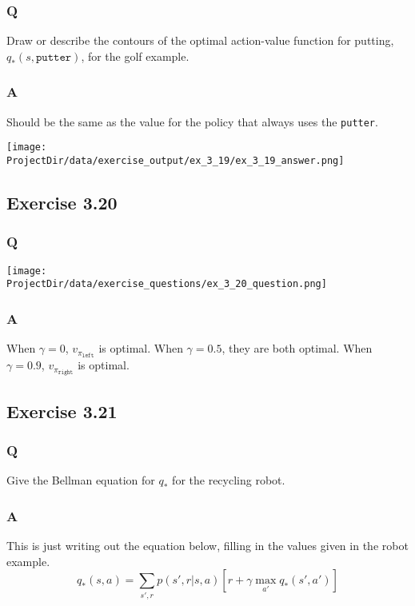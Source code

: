 \subsubsection*{Q}
 Draw or describe the contours of the optimal action-value function for putting, $q_*(s, \mathtt{putter})$, for the golf example.

\subsubsection*{A}
Should be the same as the value for the policy that always uses the \texttt{putter}.

\texttt{[image: \\ProjectDir/data/exercise\_output/ex\_3\_19/ex\_3\_19\_answer.png]}


\subsection{Exercise 3.20}
\subsubsection*{Q}
\texttt{[image: \\ProjectDir/data/exercise\_questions/ex\_3\_20\_question.png]}
 
\subsubsection*{A}
When $\gamma=0$, $v_{\pi_{\mathtt{left}}}$ is optimal. When $\gamma = 0.5$, they are both optimal. When $\gamma=0.9$, $v_{\pi_{\mathtt{right}}}$ is optimal.

\subsection{Exercise 3.21}
\subsubsection*{Q}
Give the Bellman equation for $q_*$ for the recycling robot.

\subsubsection*{A}
This is just writing out the equation below, filling in the values given in the robot example.
\begin{equation}
    q_*(s, a) = \sum_{s', r} p(s', r | s, a)[r + \gamma \max_{a'} q_*(s', a')]
\end{equation}

